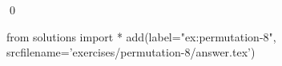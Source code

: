 
\begin{ex} 
  \label{ex:permutation-8}
  
  \qed
\end{ex} 
\begin{python0}
from solutions import *
add(label="ex:permutation-8",
    srcfilename='exercises/permutation-8/answer.tex') 
\end{python0}
